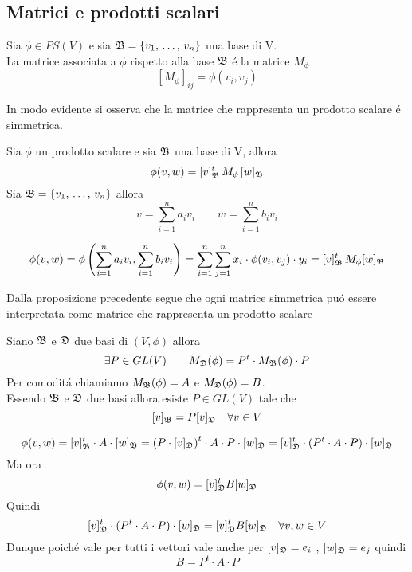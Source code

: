 \subsection{Matrici e prodotti scalari}
\begin{defn}\bianco
Sia $\phi \in PS(V) $ e sia $\mathfrak{B}= \{ v_1, \, \dots , \, v_n \} $ una base di V.\\
La matrice associata a $\phi$ rispetto alla base $\mathfrak{B} $ \'e la matrice $M_\phi$
$$ \left[ M_\phi \right]_{ij} = \phi(v_i,v_j) $$
\end{defn}
\begin{oss}In modo evidente si osserva che la matrice che rappresenta un prodotto scalare \'e simmetrica.
\end{oss}
\spazio
\begin{prop}\bianco
Sia $\phi$ un prodotto scalare e sia $\mathfrak{B}$ una base di V, allora 
$$ \phi(v,w) = [v]^t_{\mathfrak{B}} \, M_\phi \, [w]_{\mathfrak{B}} $$
\proof  Sia $\mathfrak{B}= \{ v_1, \, \dots , \, v_n \} $ allora 
$$ v = \sum_{i=1}^n a_i v_i \qquad w = \sum_{i=1}^n b_i v_i $$

$$ \phi(v,w) = \phi \left( \sum_{i=1}^n a_i v_i , \sum_{i=1}^n b_i v_i \right) = \sum_{i=1}^n \sum_{j=1}^n  x_i \cdot \phi(v_i, v_j) \cdot y_i = [v]_{\mathfrak{B}} ^t \, M_\phi [w]_{\mathfrak{B}} $$
\endproof
\end{prop}
\begin{oss}Dalla proposizione precedente segue che ogni matrice simmetrica pu\'o essere interpretata come matrice che rappresenta un prodotto scalare
\end{oss}
\newpage
\begin{prop}\bianco
Siano $\mathfrak{B}$ e $\mathfrak{D}$ due basi di $(V,\phi) $ allora
$$ \exists P \in GL(V) \qquad M_{\mathfrak{D}} (\phi) = P^t \cdot M_{\mathfrak{B}}(\phi) \cdot P $$
\proof
Per  comodit\'a chiamiamo $M_{\mathfrak{B}}(\phi) = A $ e $M_{\mathfrak{D}}(\phi) = B $.\\
Essendo $\mathfrak{B}$ e $\mathfrak{D} $ due basi allora esiste $P\in GL(V) $ tale che 
$$ [v]_{\mathfrak{B}} = P [v]_{\mathfrak{D}} \quad \forall v \in V $$


$$ \phi(v,w) =  [v]_{\mathfrak{B}}^t \cdot A \cdot [w]_{\mathfrak{B}} =  \left(P \cdot [v]_{\mathfrak{D}}  \right)^t \cdot A \cdot P \cdot [w]_{\mathfrak{D}} = 
 [v]_{\mathfrak{D}}^t \cdot (  P^t \cdot A \cdot P ) \cdot [w]_{\mathfrak{D}} $$
Ma ora
$$ \phi(v,w) = [v]_{\mathfrak{D}}^t B [w]_{\mathfrak{D}}$$
Quindi 
$$ [v]_{\mathfrak{D}}^t \cdot (  P^t \cdot A \cdot P ) \cdot [w]_{\mathfrak{D}}  = [v]_{\mathfrak{D}}^t B [w]_{\mathfrak{D}} \quad \forall v,w \in V $$
Dunque poich\'e vale per tutti i vettori vale anche per $[v]_{\mathfrak{D}}=e_i $ , $[w]_{\mathfrak{D}}=e_j $  quindi 
$$ B = P^t \cdot A \cdot P $$ \endproof
\end{prop}


